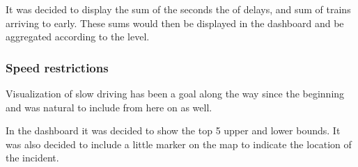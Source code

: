 It was decided to display the sum of the seconds the of delays, and sum of 
trains arriving to early. These sums would then be displayed in the dashboard 
and be aggregated according to the level.


\subsubsection{Speed restrictions} %
\label{ssub:speed_restrictions}
Visualization of slow driving has been a goal along the way since the beginning
and was natural to include from here on as well.

In the dashboard it was decided to show the top 5 upper and lower bounds.
It was also decided to include a little marker on the map to indicate the
location of the incident.



